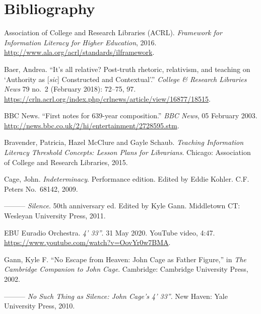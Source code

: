 \newpageforperformers{}

\section{Bibliography}

\begin{mybiblist}

\small

\item Association of College and Research Libraries (ACRL).  \textit{Framework for Information Literacy for Higher Education}, 2016. \url{http://www.ala.org/acrl/standards/ilframework}.

\item Baer, Andrea. ``It's all relative? Post-truth rhetoric, relativism, and teaching on `Authority as [\textit{sic}] Constructed and Contextual'.'' \textit{College \& Research Libraries News} 79 no.\ 2 (February 2018): 72--75, 97.  \url{https://crln.acrl.org/index.php/crlnews/article/view/16877/18515}.

\item BBC News.  ``First notes for 639-year composition.''  \textit{BBC News}, 05 February 2003.  \url{http://news.bbc.co.uk/2/hi/entertainment/2728595.stm}.

\item Bravender, Patricia, Hazel McClure and Gayle Schaub.  \textit{Teaching Information Literacy Threshold Concepts: Lesson Plans for Librarians}.  Chicago: Association of College and Research Libraries, 2015.

\item Cage, John.  \textit{Indeterminacy}.  Performance edition.  Edited by Eddie Kohler.  C.F. Peters No.~68142, 2009.

\item ---------  \textit{Silence}.  50th anniversary ed. Edited by Kyle Gann.  Middletown CT: Wesleyan University Press, 2011.

\item EBU Euradio Orchestra. \textit{4' 33''}.  31 May 2020.  YouTube video, 4:47.  \url{https://www.youtube.com/watch?v=OovYr0w7BMA}.

\item Gann, Kyle F. ``No Escape from Heaven: John Cage as Father Figure,'' in \textit{The Cambridge Companion to John Cage}. Cambridge: Cambridge University Press, 2002.

\item ---------  \textit{No Such Thing as Silence: John Cage's \textit{4' 33''}}.  New Haven: Yale University Press, 2010.


\end{mybiblist}

